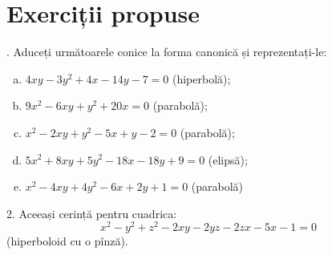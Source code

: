 
\section{Exerciții propuse}

\indent{}. Aduceți următoarele conice la forma canonică și reprezentați-le:
\begin{enumerate}[(a)]
\item $ 4xy - 3y^2 + 4x - 14y - 7 = 0 $ (hiperbolă);
\item $ 9x^2 - 6xy + y^2 + 20x = 0 $ (parabolă);
\item $ x^2 - 2xy + y^2 - 5x + y - 2 = 0 $ (parabolă);
\item $ 5x^2 + 8xy + 5y^2 - 18x - 18y + 9 = 0 $ (elipsă);
\item $ x^2 - 4xy + 4y^2 - 6x + 2y + 1 = 0 $ (parabolă)
\end{enumerate}

\vspace{1cm}

2. Aceeași cerință pentru cuadrica:
\[
  x^2 - y^2 + z^2 - 2xy - 2yz - 2zx - 5x - 1 = 0
\]
(hiperboloid cu o pînză).



